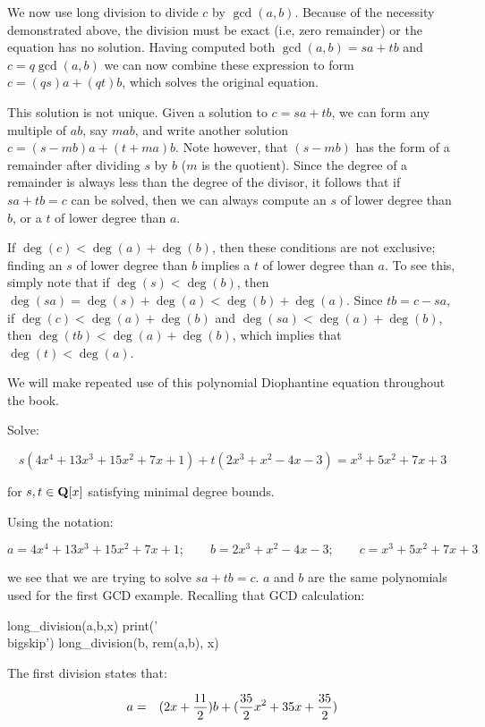 We now use long division to divide $c$ by $\gcd(a,b)$.  Because of the
necessity demonstrated above, the division must be exact (i.e, zero
remainder) or the equation has no solution.  Having computed both
$\gcd(a,b)=sa+tb$ and $c=q\gcd(a,b)$ we can now combine these
expression to form $c=(qs)a+(qt)b$, which solves the original
equation.

This solution is not unique.  Given a solution to $c=sa+tb$, we can
form any multiple of $ab$, say $mab$, and write another solution
$c=(s-mb)a+(t+ma)b$.  Note however, that $(s-mb)$ has the form of a
remainder after dividing $s$ by $b$ ($m$ is the quotient).  Since the
degree of a remainder is always less than the degree of the divisor,
it follows that if $sa+tb=c$ can be solved, then we can always compute
an $s$ of lower degree than $b$, or a $t$ of lower degree than $a$.

If $\deg(c)<\deg(a)+\deg(b)$, then these conditions are not exclusive;
finding an $s$ of lower degree than $b$ implies a $t$ of lower degree
than $a$.  To see this, simply note that if $\deg(s)<\deg(b)$, then
$\deg(sa)=\deg(s)+\deg(a)<\deg(b)+\deg(a)$.  Since $tb=c-sa$, if
$\deg(c)<\deg(a)+\deg(b)$ and $\deg(sa)<\deg(a)+\deg(b)$, then
$\deg(tb)<\deg(a)+\deg(b)$, which implies that $\deg(t)<\deg(a)$.

We will make repeated use of this polynomial Diophantine equation
throughout the book.

\vfill\eject

\example

Solve:

$$s(4x^4+13x^3+15x^2+7x+1) + t(2x^3+x^2-4x-3) = x^3 + 5x^2 + 7x +3$$

\quad for $s,t \in {\bf Q}[x]$ satisfying minimal degree bounds.

Using the notation:

$$a = 4x^4+13x^3+15x^2+7x+1; \qquad
b = 2x^3+x^2-4x-3; \qquad
c = x^3 + 5x^2 + 7x +3$$

we see that we are trying to solve $sa+tb=c$.
$a$ and $b$ are the same polynomials used for the first GCD example.
Recalling that GCD calculation:

\bigskip
\begin{sympycode}
long_division(a,b,x)
print('\\bigskip')
long_division(b, rem(a,b), x)
\end{sympycode}

The first division states that:

\begin{eqnarray*}
a &=& (2x+{11\over2})b + ({35\over2}x^2+35x+{35\over2})
\end{eqnarray*}

